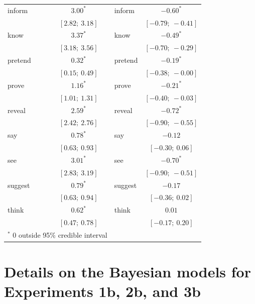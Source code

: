 \documentclass[11pt,fleqn]{article}
\newcommand{\6}{\mbox{$[\hspace*{-.6mm}[$}}
\newcommand{\9}{\mbox{$]\hspace*{-.6mm}]$}}
\begin{document}
{\begin{table}
\begin{center}
\begin{tabular}{l c l c}
inform  & $3.00^{*}$ &	 inform & $-0.60^{*}$  \\
		
& $[2.82;\ 3.18]$  &	& $[-0.79;\ -0.41]$ \\
		
know  & $3.37^{*}$ &	 know & $-0.49^{*}$  \\
		
& $[3.18;\ 3.56]$  &	& $[-0.70;\ -0.29]$ \\
		
pretend & $0.32^{*}$ &	 pretend  & $-0.19^{*}$  \\
		
& $[0.15;\ 0.49]$  &	& $[-0.38;\ -0.00]$ \\
		
prove & $1.16^{*}$ &	 prove  & $-0.21^{*}$  \\
		
& $[1.01;\ 1.31]$  &	& $[-0.40;\ -0.03]$ \\
		
reveal  & $2.59^{*}$ &	 reveal & $-0.72^{*}$  \\
		
& $[2.42;\ 2.76]$  &	& $[-0.90;\ -0.55]$ \\
		
say & $0.78^{*}$ &	 say  & $-0.12$  \\
		
& $[0.63;\ 0.93]$  &	& $[-0.30;\ 0.06]$ \\
		
see & $3.01^{*}$ &	 see  & $-0.70^{*}$  \\
		
& $[2.83;\ 3.19]$  &	& $[-0.90;\ -0.51]$ \\
		
suggest & $0.79^{*}$ &	 suggest  & $-0.17$  \\
		
& $[0.63;\ 0.94]$  &	& $[-0.36;\ 0.02]$ \\
		
think & $0.62^{*}$ &	 think  & $0.01$ \\
		
& $[0.47;\ 0.78]$  &	& $[-0.17;\ 0.20]$ \\\hline
\multicolumn{2}{l}{\scriptsize{$^*$ 0 outside 95\% credible interval}}
\end{tabular}
\label{tab:exp1amodelresults}
\end{center}
\end{table}


\section{Details on the Bayesian models for Experiments 1b, 2b, and 3b}\label{modeldetails-b}

}
\end{document}
